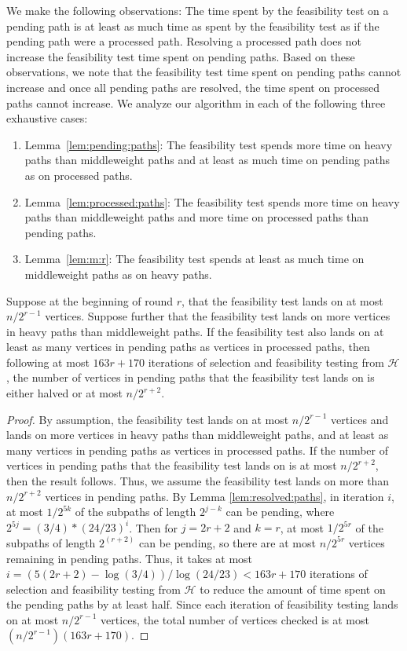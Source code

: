 \noindent
We make the following observations: The time spent by the feasibility test on a pending path is at least as much time as spent by the feasibility test as if the pending path were a processed path. Resolving a processed path does not increase the feasibility test time spent on pending paths. 
Based on these observations, we note that the feasibility test time spent on pending paths cannot increase and once all pending paths are resolved, the time spent on processed paths cannot increase.
We analyze our algorithm in each of the following three exhaustive cases:
\begin{enumerate}
\item
Lemma~\ref{lem:pending:paths}: The feasibility test spends more time on heavy paths than middleweight paths and at least as much time on pending paths as on processed paths.
\item
Lemma~\ref{lem:processed:paths}: The feasibility test spends more time on heavy paths than middleweight paths and more time on processed paths than pending paths.
\item
Lemma~\ref{lem:m:r}: The feasibility test spends at least as much time on middleweight paths as on heavy paths.
\end{enumerate}

\begin{lemma}
\label{lem:pending:paths}
Suppose at the beginning of round $r$, that the feasibility test lands on at most $n/2^{r-1}$ vertices. Suppose further that the feasibility test lands on more vertices in heavy paths than middleweight paths. If the feasibility test also lands on at least as many vertices in pending paths as vertices in processed paths, then following at most $163r+170$ iterations of selection and feasibility testing from $\mathcal{H}$, the number of vertices in pending paths that the feasibility test lands on is either halved or at most $n/2^{r+2}$.
\end{lemma}
\begin{proof}
By assumption, the feasibility test lands on at most $n/2^{r-1}$ vertices and lands on more vertices in heavy paths than middleweight paths, and at least as many vertices in pending paths as vertices in processed paths. 
If the number of vertices in pending paths that the feasibility test lands on is at most $n/2^{r+2}$, then the result follows. 
Thus, we assume the feasibility test lands on more than $n/2^{r+2}$ vertices in pending paths. 
By Lemma \ref{lem:resolved:paths}, in iteration $i$, at most $1/2^{5k}$ of the subpaths of length $2^{j-k}$ can be pending, where $2^{5j}=(3/4)*(24/23)^i$. 
Then for $j=2r+2$ and $k=r$, at most $1/2^{5r}$ of the subpaths of length $2^{(r+2)}$ can be pending, so there are at most $n/2^{5r}$ vertices remaining in pending paths. 
Thus, it takes at most $i=(5(2r+2)-\log(3/4))/\log(24/23)<163r+170$ iterations of selection and feasibility testing from $\mathcal{H}$ to reduce the amount of time spent on the pending paths by at least half. 
Since each iteration of feasibility testing lands on at most $n/2^{r-1}$ vertices, the total number of vertices checked is at most $\left(n/2^{r-1}\right)(163r+170)$.
\end{proof}

